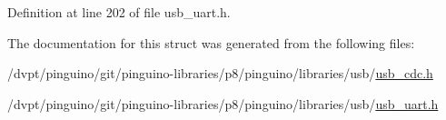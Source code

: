 Definition at line 202 of file usb\-\_\-uart.\-h.



The documentation for this struct was generated from the following files\-:\begin{DoxyCompactItemize}
\item 
/dvpt/pinguino/git/pinguino-\/libraries/p8/pinguino/libraries/usb/\hyperlink{usb__cdc_8h}{usb\-\_\-cdc.\-h}\item 
/dvpt/pinguino/git/pinguino-\/libraries/p8/pinguino/libraries/usb/\hyperlink{usb__uart_8h}{usb\-\_\-uart.\-h}\end{DoxyCompactItemize}
